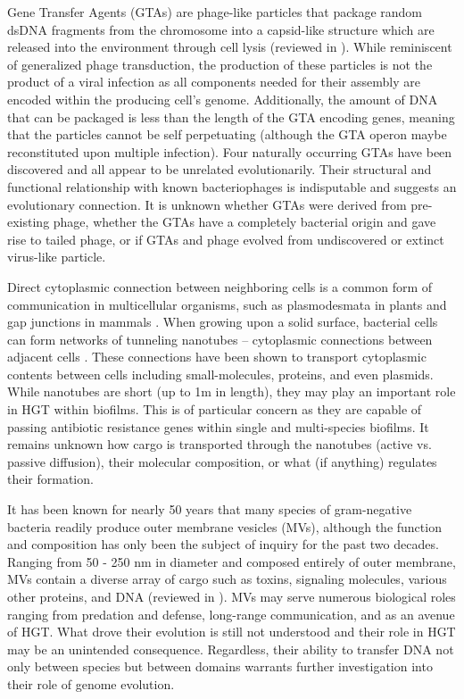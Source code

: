 Gene Transfer Agents (GTAs) are  phage-like particles that package random dsDNA
fragments from the chromosome into a capsid-like structure which are released
into the environment through cell lysis (reviewed in \citet{Lang:2012df}). While
reminiscent of generalized phage transduction, the production of these
particles is not the product of a viral infection as all components needed for
their assembly are encoded within the producing cell's genome. Additionally, the
amount of DNA that can be packaged is less than the length of the GTA encoding
genes, meaning that the particles cannot be self perpetuating (although the GTA
operon maybe reconstituted upon multiple infection). Four
naturally occurring GTAs have been discovered and all appear to be unrelated
evolutionarily. Their structural and functional relationship with known
bacteriophages is indisputable and suggests an evolutionary connection. It is
unknown whether GTAs were derived from pre-existing phage, whether the GTAs
have a completely bacterial origin and gave rise to tailed phage, or if GTAs
and phage evolved from undiscovered or extinct virus-like particle.

Direct cytoplasmic connection between neighboring cells is a common form of
communication in multicellular organisms, such as plasmodesmata in
plants \cite{Heinlein:2004fa} and gap junctions in mammals \cite{Kumar:1996tm}.
When growing upon a solid surface, bacterial cells can form networks of
tunneling nanotubes -- cytoplasmic connections between adjacent
cells \cite{Dubey:2011dp}. These connections have been shown to transport
cytoplasmic contents between cells including small-molecules, proteins, and even
plasmids. While nanotubes are short (up to 1\textmu m in length), they may play
an important role in HGT within biofilms.  This is of particular concern as they
are capable of passing antibiotic resistance genes within single and
multi-species biofilms. It remains unknown how cargo is transported through the
nanotubes (active vs. passive diffusion), their molecular composition, or what
(if anything) regulates their formation.

It has been known for nearly 50 years that many species of gram-negative
bacteria readily produce outer membrane vesicles (MVs), although the function
and composition has only been the subject of inquiry for the past two decades.
Ranging from 50 - 250 nm in diameter and composed entirely of outer membrane,
MVs contain a diverse array of cargo such as toxins, signaling molecules,
various other proteins, and DNA (reviewed in \citet{MashburnWarren:2006jc}). MVs
may serve numerous biological roles ranging from predation and defense,
long-range communication, and as an avenue of HGT. What drove their evolution is
still not understood and their role in HGT may be an unintended
consequence. Regardless, their ability to transfer DNA not only between species
but between domains warrants further investigation into their role of genome evolution.


